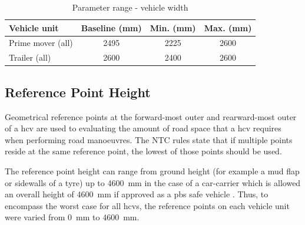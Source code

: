\begin{table}[H]
	\centering\footnotesize
	\begin{threeparttable}

		\begin{tabulary}{\textwidth}{lccc}
			\toprule
			\textbf{Vehicle unit} & \textbf{Baseline (mm)} & \textbf{Min. (mm)} & \textbf{Max. (mm)} \\
			\midrule
			Prime mover (all) & 2495  & 2225  & 2600 \\
			Trailer (all) & 2600  & 2400  & 2600 \\
			\bottomrule
		\end{tabulary}

		\caption{Parameter range - vehicle width}
		\label{table:pr-vehicle-width}


	\end{threeparttable}
\end{table}

\subsection{Reference Point Height}\label{section-pr-ref-point-height}

Geometrical reference points at the forward-most outer and rearward-most outer of a \gls{hcv} are used to evaluating the amount of road space that a \gls{hcv} requires when performing road manoeuvres. The NTC rules \cite{NationalTransportCommission2008} state that if multiple points reside at the same reference point, the lowest of those points should be used.

The reference point height can range from ground height (for example a mud flap or sidewalls of a tyre) up to 4600~mm in the case of a car-carrier which is allowed an overall height of 4600~mm if approved as a \gls{pbs} safe vehicle \cite{AbnormalLoadTechnicalCommittee2014}. Thus, to encompass the worst case for all \glspl{hcv}, the reference points on each vehicle unit were varied from 0~mm to 4600~mm.

